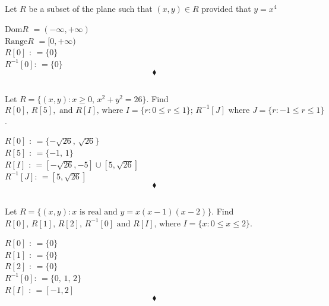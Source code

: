 \subsection{}
\begin{tcolorbox}
 Let $R$ be a subset of the plane such that $(x,y)\in R$ provided that $y=x^4$
\end{tcolorbox}
\begin{figure}[H]%
    \centering
    \subfloat[The relation $y=x^4$]{}
\label{fig:fig_p8b}
\end{figure}
$$ $$
\textbf{$\text{Dom}R$} $=(-\infty,+\infty)$\\
\textbf{$\text{Range} R$} $=[0,+\infty)$\\
\textbf{$R[0]$ }:  $=\{0\}$\\
\textbf{$R^{-1}[0]$}:  $=\{0\}$\\
$$\blacklozenge$$


\subsection{}
\begin{tcolorbox}
 Let $R=\{(x,y):x\ge 0,\, x^2+y^2=26\}$. Find $R[0],\, R[5],\text{ and } R[I]\text{, where } I= \{r:0\le r\le 1\};\, R^{-1}[J]\text{ where } J=  \{r:-1\le r\le 1\}$.
\end{tcolorbox}
$$ $$
\textbf{$R[0]$ }:  $=\{-\sqrt{26},\,\sqrt{26} \}$\\
\textbf{$R[5]$ }:  $=\{-1,\,1 \}$\\
\textbf{$R[I]$ }:  $=[-\sqrt{26},-5]\cup [5,\sqrt{26}] $\\
\textbf{$R^{-1}[J]$}:  $=[5,\sqrt{26}]$\\
$$\blacklozenge$$

\subsection{}
\begin{tcolorbox}
 Let $R=\{(x,y):x\text{ is real and }y=x(x-1)(x-2)\}$. Find $R[0],\, R[1],\, R[2],\, R^{-1}[0]\text{ and } R[I]\text{, where } I= \{x:0\le x\le 2\}$.
\end{tcolorbox}
$$ $$ 
\textbf{$R[0]$ }:  $=\{0\}$\\
\textbf{$R[1]$ }: $=\{0 \}$\\
\textbf{$R[2]$ }:   $=\{0 \}$\\
\textbf{$R^{-1}[0]$}:  $=\{0,\, 1 ,\, 2 \}$\\
\textbf{$R[I]$ }:  $=[-1,2] $\\
$$\blacklozenge$$

